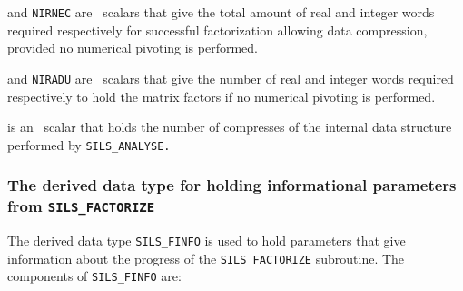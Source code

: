\documentclass{galahad}
\newcommand{\packagename}{SILS}
\begin{document}
\begin{description}
 and {\tt NIRNEC} are \integer\ scalars that give the total
 amount
 of real and integer words required respectively for successful
 factorization allowing data compression, provided no numerical pivoting
 is performed.

 and {\tt NIRADU} are \integer\ scalars that give the number
 of real and integer words required respectively to hold the matrix
 factors if no numerical pivoting is performed.

 is an \integer\ scalar that holds the number of compresses
 of the internal data structure performed by {\tt \packagename\_AN\-ALYSE.}

\end{description}


\subsubsection{The derived data type for holding informational
 parameters from {\tt \packagename\_FACTORIZE}}\label{typeinfof}
The derived data type
{\tt \packagename\_FINFO}
is used to hold parameters that give information about the progress of the
{\tt \packagename\_FAC\-TORIZE} subroutine. The components of
{\tt \packagename\_FINFO}
are:
\end{document}
